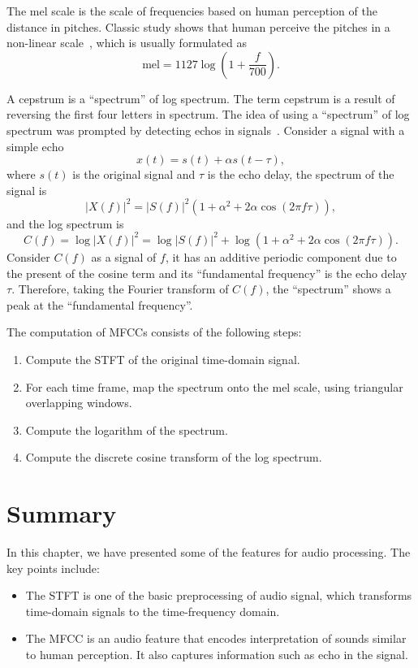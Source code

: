 \documentclass[12pt,final,twoside]{report}
\begin{document}
The mel scale is the scale of frequencies based on human perception of the distance in pitches. Classic study shows that human perceive the pitches in a non-linear scale~\cite{stevens_scale_1937}, which is usually formulated as~\cite{oshaughnessy_speech_1987}
\begin{equation}
  \text{mel} = 1127 \log (1 + \frac{f}{700}) .
\end{equation}

A cepstrum is a ``spectrum'' of log spectrum. The term cepstrum is a result of reversing the first four letters in spectrum. The idea of using a ``spectrum'' of log spectrum was prompted by detecting echos in signals~\cite{oppenheim_frequency_2004}. Consider a signal with a simple echo
\begin{equation}
  x(t) = s(t) + \alpha s(t - \tau),
\end{equation}
where $s(t)$ is the original signal and $\tau$ is the echo delay, the spectrum of the signal is
\begin{equation}
  \left| X(f) \right|^2 = \left| S(f) \right|^2 (1 + \alpha^2 + 2 \alpha \cos(2 \pi f \tau)),
\end{equation}
and the log spectrum is
\begin{equation}
  C(f) = \log \left| X(f) \right|^2 = \log \left| S(f) \right|^2 + \log (1 + \alpha^2 + 2 \alpha \cos(2 \pi f \tau)).
\end{equation}
Consider $C(f)$ as a signal of $f$, it has an additive periodic component due to the present of the cosine term and its ``fundamental frequency'' is the echo delay $\tau$. Therefore, taking the Fourier transform of $C(f)$, the ``spectrum'' shows a peak at the ``fundamental frequency''. 

The computation of MFCCs consists of the following steps:
\begin{enumerate}
  \item Compute the STFT of the original time-domain signal.
  \item For each time frame, map the spectrum onto the mel scale, using triangular overlapping windows.
  \item Compute the logarithm of the spectrum.
  \item Compute the discrete cosine transform of the log spectrum.
\end{enumerate}

\section{Summary}
In this chapter, we have presented some of the features for audio processing. The key points include:
\begin{itemize}
  \item The STFT is one of the basic preprocessing of audio signal, which transforms time-domain signals to the time-frequency domain.
  \item The MFCC is an audio feature that encodes interpretation of sounds similar to human perception. It also captures information such as echo in the signal.
\end{itemize}
\end{document}
